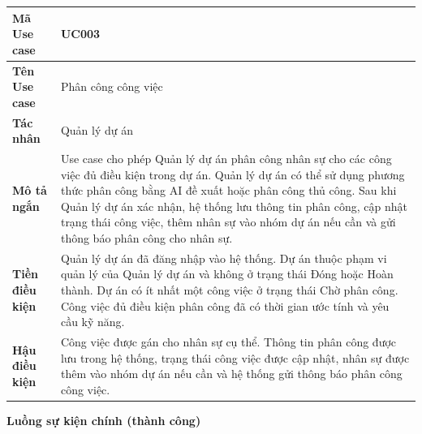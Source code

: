 \documentclass[../DoAn.tex]{subfiles}
\begin{document}
{\ucTableText
\begin{longtable}{|>{\columncolor{ucLabelBg}\bfseries}p{}|p{}|}
\hline
Mã Use case & UC003 \\ \hline
Tên Use case & Phân công công việc \\ \hline
Tác nhân & Quản lý dự án \\ \hline
Mô tả ngắn & Use case cho phép Quản lý dự án phân công nhân sự cho các công việc đủ điều kiện trong dự án. Quản lý dự án có thể sử dụng phương thức phân công bằng AI đề xuất hoặc phân công thủ công. Sau khi Quản lý dự án xác nhận, hệ thống lưu thông tin phân công, cập nhật trạng thái công việc, thêm nhân sự vào nhóm dự án nếu cần và gửi thông báo phân công cho nhân sự. \\ \hline
Tiền điều kiện & Quản lý dự án đã đăng nhập vào hệ thống. Dự án thuộc phạm vi quản lý của Quản lý dự án và không ở trạng thái Đóng hoặc Hoàn thành. Dự án có ít nhất một công việc ở trạng thái Chờ phân công. Công việc đủ điều kiện phân công đã có thời gian ước tính và yêu cầu kỹ năng. \\ \hline
Hậu điều kiện & Công việc được gán cho nhân sự cụ thể. Thông tin phân công được lưu trong hệ thống, trạng thái công việc được cập nhật, nhân sự được thêm vào nhóm dự án nếu cần và hệ thống gửi thông báo phân công công việc. \\ \hline
\end{longtable}
}

\textbf{Luồng sự kiện chính (thành công)}
\end{document}
